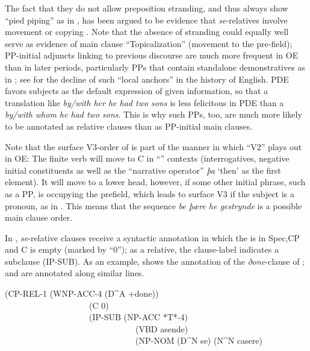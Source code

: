 \documentclass[output=paper,colorlinks,citecolor=brown]{langscibook}
\begin{document}
The fact that they do not allow preposition stranding, and thus always show “pied piping” as in , has been argued to be evidence that \textit{se}{}-relatives involve movement or copying \citep[91]{Allen1977}. Note that the absence of stranding could equally well serve as evidence of main clause “Topicalization” (movement to the pre-field); PP-initial adjuncts linking to previous discourse are much more frequent in OE than in later periods, particularly PPs that contain standalone demonstratives as in ; see \citet{los2023decline} for the decline of such “local anchors” in the history of English. PDE favors subjects as the default expression of given information, so that a translation like \textit{by/with her he had two sons} is less felicitous in PDE than a  \textit{by/with whom he had two sons}. This is why such PPs, too, are much more likely to be annotated as relative clauses than as PP-initial main clauses. 

Note that the surface V3-order of  is part of the manner in which “V2” plays out in OE: The finite verb will move to C in “” contexts (interrogatives, negative initial constituents as well as the “narrative operator” \textit{þa} ‘then' as the first element). It will move to a lower head, however, if some other initial phrase, such as a PP, is occupying the prefield, which leads to surface V3 if the subject is a pronoun, as in  \citep{vanKemenade1987}. This means that the sequence \textit{be þære he gestrynde} is a possible main clause order.

In , \textit{se}{}-relative clauses receive a syntactic annotation in which the  is in Spec,CP and C is empty (marked by “0”); as a relative, the clause-label indicates a subclause (IP-SUB). As an example,  shows the annotation of the \textit{ðone}{}-clause of ;  and  are annotated along similar lines.


 \ea\label{ex:los:12}
 (CP-REL-1 (WNP-ACC-4 (D\^{}A +done))\\
 ~~~~~~~~~~~~~~~~~~~~(C 0) \\
 ~~~~~~~~~~~~~~~~~~~~(IP-SUB (NP-ACC *T*-4)\\
 ~~~~~~~~~~~~~~~~~~~~~~~~~~~~~~~(VBD asende)\\
 ~~~~~~~~~~~~~~~~~~~~~~~~~~~~~~~(NP-NOM (D\^{}N se) (N\^{}N casere)\\
\z
\end{document}
